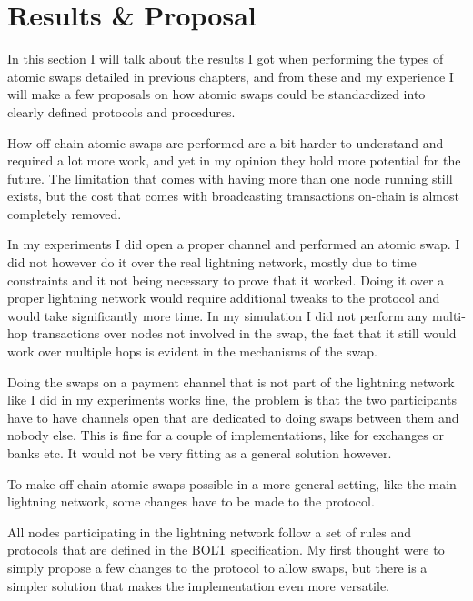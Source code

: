 \chapter{Results \& Proposal}
In this section I will talk about the results I got when performing the types 
of atomic swaps detailed in previous chapters, and from these and my experience 
I will make a few proposals on how atomic swaps could  be standardized into 
clearly defined protocols and procedures. 




How off-chain atomic swaps are performed are a bit harder to understand and 
required a lot more work, and yet in my opinion they hold more potential for 
the future. The limitation that comes with having more than one node running 
still exists, but the cost that comes with broadcasting transactions on-chain 
is almost completely removed. 

In my experiments I did open a proper channel and performed an atomic swap. 
I did not however do it over the real lightning  network, mostly due to time 
constraints and it not being necessary to prove that it worked. Doing it over 
a proper lightning network would require additional tweaks to the protocol and 
would take significantly more time. In my simulation I did not perform any 
multi-hop transactions over nodes not involved in the swap, the fact that it
still would work over multiple hops is evident in the mechanisms of the swap.

Doing the swaps on a payment channel that is not part of the lightning network
like I did in my experiments works fine, the problem is that the two participants
have to have channels open that are dedicated to doing swaps between them and nobody
else. This is fine for a couple of implementations, like for exchanges or banks 
etc. It would not be very fitting as a general solution however. 

To make off-chain atomic swaps possible in a more general setting, like the main
lightning network, some changes have to be made to the protocol. 

All nodes participating in the lightning network follow a set of rules and 
protocols that are defined in the BOLT specification. My first thought were to
simply propose a few changes to the protocol to allow swaps, but there is a 
simpler solution that makes the implementation even more versatile. 

